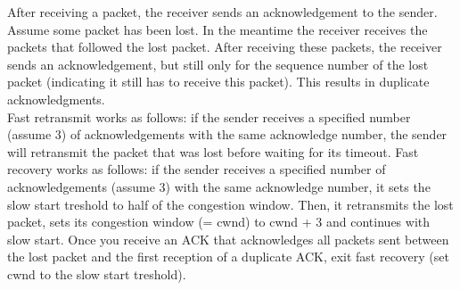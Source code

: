 After receiving a packet, the receiver sends an acknowledgement to the sender. \\
Assume some packet has been lost. In the meantime the receiver receives the packets that followed the lost packet.
After receiving these packets, the receiver sends an acknowledgement, but still only for the sequence number of the lost packet (indicating it still has to receive this packet).
This results in duplicate acknowledgments. \\
Fast retransmit works as follows: if the sender receives a specified number (assume 3) of acknowledgements with the same acknowledge number, the sender will retransmit the packet that was lost before waiting for its timeout.
Fast recovery works as follows: if the sender receives a specified number of acknowledgements (assume 3) with the same acknowledge number, it sets the slow start treshold to half of the congestion window.
Then, it retransmits the lost packet, sets its congestion window (= cwnd) to cwnd + 3 and continues with slow start.
Once you receive an ACK that acknowledges all packets sent between the lost packet and the first reception of a duplicate ACK, exit fast recovery (set cwnd to the slow start treshold).